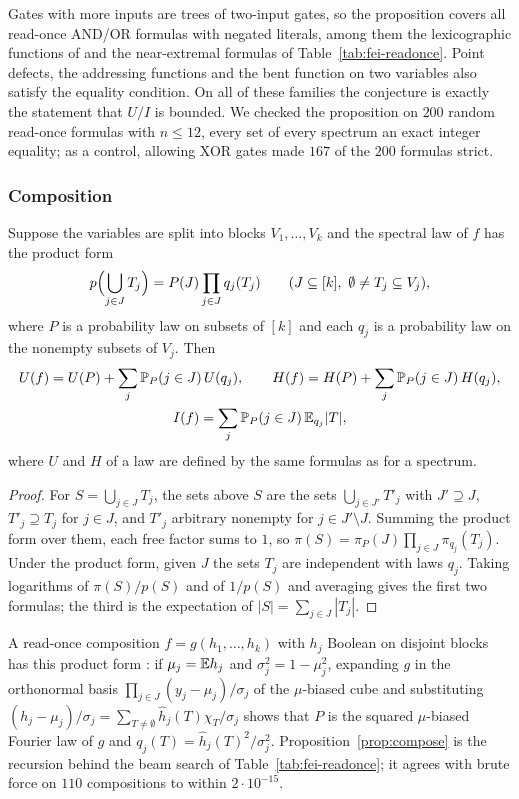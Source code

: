 Gates with more inputs are trees of two-input gates, so the proposition covers all read-once AND/OR formulas with negated literals, among them the lexicographic functions of \cite{Hod2017} and the near-extremal formulas of Table~\ref{tab:fei-readonce}. Point defects, the addressing functions and the bent function on two variables also satisfy the equality condition. On all of these families the conjecture is exactly the statement that $U/I$ is bounded. We checked the proposition on $200$ random read-once formulas with $n\le12$, every set of every spectrum an exact integer equality; as a control, allowing XOR gates made $167$ of the $200$ formulas strict.

\subsubsection*{Composition}
\begin{proposition}\label{prop:compose}
Suppose the variables are split into blocks $V_1,\dots,V_k$ and the spectral law of $f$ has the product form
\[
p\Bigl(\bigcup_{j\in J}T_j\Bigr)=P(J)\prod_{j\in J}q_j(T_j)\qquad(J\subseteq[k],\ \emptyset\ne T_j\subseteq V_j),
\]
where $P$ is a probability law on subsets of $[k]$ and each $q_j$ is a probability law on the nonempty subsets of $V_j$. Then
\begin{gather*}
U(f)=U(P)+\sum_j\mathbb{P}_P(j\in J)\,U(q_j),\qquad H(f)=H(P)+\sum_j\mathbb{P}_P(j\in J)\,H(q_j),\\
I(f)=\sum_j\mathbb{P}_P(j\in J)\,\mathbb{E}_{q_j}|T|,
\end{gather*}
where $U$ and $H$ of a law are defined by the same formulas as for a spectrum.
\end{proposition}

\begin{proof}
For $S=\bigcup_{j\in J}T_j$, the sets above $S$ are the sets $\bigcup_{j\in J'}T'_j$ with $J'\supseteq J$, $T'_j\supseteq T_j$ for $j\in J$, and $T'_j$ arbitrary nonempty for $j\in J'\setminus J$. Summing the product form over them, each free factor sums to $1$, so $\pi(S)=\pi_P(J)\prod_{j\in J}\pi_{q_j}(T_j)$. Under the product form, given $J$ the sets $T_j$ are independent with laws $q_j$. Taking logarithms of $\pi(S)/p(S)$ and of $1/p(S)$ and averaging gives the first two formulas; the third is the expectation of $|S|=\sum_{j\in J}|T_j|$.
\end{proof}

A read-once composition $f=g(h_1,\dots,h_k)$ with $h_j$ Boolean on disjoint blocks has this product form \cite{OT2013}: if $\mu_j=\mathbb{E} h_j$ and $\sigma_j^2=1-\mu_j^2$, expanding $g$ in the orthonormal basis $\prod_{j\in J}(y_j-\mu_j)/\sigma_j$ of the $\mu$-biased cube and substituting $(h_j-\mu_j)/\sigma_j=\sum_{T\ne\emptyset}\hat h_j(T)\chi_T/\sigma_j$ shows that $P$ is the squared $\mu$-biased Fourier law of $g$ and $q_j(T)=\hat h_j(T)^2/\sigma_j^2$. Proposition~\ref{prop:compose} is the recursion behind the beam search of Table~\ref{tab:fei-readonce}; it agrees with brute force on $110$ compositions to within $2\cdot10^{-15}$.

